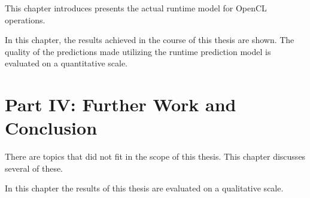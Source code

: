   \vspace{1mm}

\noindent  This chapter introduces presents the actual runtime model for OpenCL operations.   \\

  \vspace{1mm}

\noindent  In this chapter, the results achieved in the course of this thesis are shown. The quality of the predictions made utilizing the runtime prediction model is evaluated on a quantitative scale.\\

\section*{Part IV: Further Work and Conclusion}

  \vspace{1mm}

\noindent  There are topics that did not fit in the scope of this thesis. This chapter discusses several of these.   \\

  \vspace{1mm}

\noindent  In this chapter the results of this thesis are evaluated on a qualitative scale.  \\